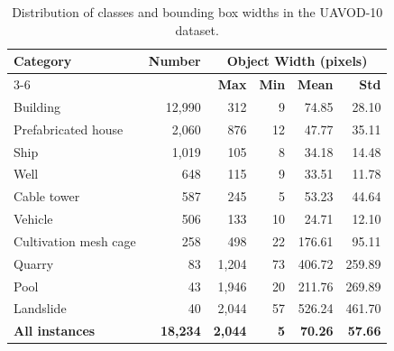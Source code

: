 \begin{table}[hbt!]
\centering
\caption{Distribution of classes and bounding box widths in the UAVOD-10 dataset.}
\label{tab:uavod10_stats}
\begin{tabular}{lrrrrr}
\toprule
\multirow{2}{*}{\textbf{Category}} & \multirow{2}{*}{\textbf{Number}} & \multicolumn{4}{c}{\textbf{Object Width (pixels)}} \\
\cmidrule(lr){3-6}
 & & \textbf{Max} & \textbf{Min} & \textbf{Mean} & \textbf{Std} \\
\midrule
Building & 12,990 & 312 & 9 & 74.85 & 28.10 \\
Prefabricated house & 2,060 & 876 & 12 & 47.77 & 35.11 \\
Ship & 1,019 & 105 & 8 & 34.18 & 14.48 \\
Well & 648 & 115 & 9 & 33.51 & 11.78 \\
Cable tower & 587 & 245 & 5 & 53.23 & 44.64 \\
Vehicle & 506 & 133 & 10 & 24.71 & 12.10 \\
Cultivation mesh cage & 258 & 498 & 22 & 176.61 & 95.11 \\
Quarry & 83 & 1,204 & 73 & 406.72 & 259.89 \\
Pool & 43 & 1,946 & 20 & 211.76 & 269.89 \\
Landslide & 40 & 2,044 & 57 & 526.24 & 461.70 \\
\midrule
\textbf{All instances} & \textbf{18,234} & \textbf{2,044} & \textbf{5} & \textbf{70.26} & \textbf{57.66} \\
\bottomrule
\end{tabular}
\end{table}

